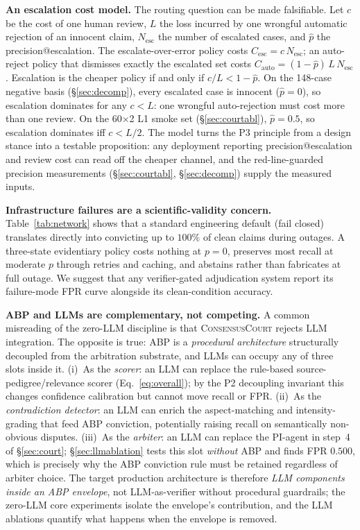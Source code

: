 \documentclass[11pt]{article}
\newcommand{\court}{\textsc{ConsensusCourt}}
\begin{document}
\textbf{An escalation cost model.} The routing question can be made
falsifiable. Let $c$ be the cost of one human review, $L$ the loss incurred
by one wrongful automatic rejection of an innocent claim,
$N_{\mathrm{esc}}$ the number of escalated cases, and $\hat p$ the
precision@escalation. The escalate-over-error policy costs
$C_{\mathrm{esc}} = c\,N_{\mathrm{esc}}$; an auto-reject policy that
dismisses exactly the escalated set costs
$C_{\mathrm{auto}} = (1-\hat p)\,L\,N_{\mathrm{esc}}$. Escalation is the
cheaper policy if and only if $c/L < 1-\hat p$. On the 148-case negative
basis (\S\ref{sec:decomp}), every escalated case is innocent
($\hat p = 0$), so escalation dominates for any $c < L$: one wrongful
auto-rejection must cost more than one review. On the 60$\times$2 L1 smoke
set (\S\ref{sec:courtabl}), $\hat p = 0.5$, so escalation dominates iff
$c < L/2$. The model turns the P3 principle from a design stance into a
testable proposition: any deployment reporting precision@escalation and
review cost can read off the cheaper channel, and the red-line-guarded
precision measurements (\S\ref{sec:courtabl}, \S\ref{sec:decomp}) supply
the measured inputs.

\textbf{Infrastructure failures are a scientific-validity concern.}
Table~\ref{tab:network} shows that a standard engineering default (fail
closed) translates directly into convicting up to $100\%$ of clean claims
during outages. A three-state evidentiary policy costs nothing at $p=0$,
preserves most recall at moderate $p$ through retries and caching, and
abstains rather than fabricates at full outage. We suggest that any
verifier-gated adjudication system report its failure-mode FPR curve
alongside its clean-condition accuracy.

\textbf{ABP and LLMs are complementary, not competing.} A common
misreading of the zero-LLM discipline is that \court{} rejects LLM
integration. The opposite is true: ABP is a \emph{procedural architecture}
structurally decoupled from the arbitration substrate, and LLMs can occupy
any of three slots inside it. (i)~As the \emph{scorer}: an LLM can replace
the rule-based source-pedigree/relevance scorer (Eq.~\ref{eq:overall}); by
the P2 decoupling invariant this changes confidence calibration but cannot
move recall or FPR. (ii)~As the \emph{contradiction detector}: an LLM can
enrich the aspect-matching and intensity-grading that feed ABP conviction,
potentially raising recall on semantically non-obvious disputes. (iii)~As
the \emph{arbiter}: an LLM can replace the PI-agent in step~4 of
\S\ref{sec:court}; \S\ref{sec:llmablation} tests this slot \emph{without}
ABP and finds FPR $0.500$, which is precisely why the ABP conviction rule
must be retained regardless of arbiter choice. The target production
architecture is therefore \emph{LLM components inside an ABP envelope},
not LLM-as-verifier without procedural guardrails; the zero-LLM core
experiments isolate the envelope's contribution, and the LLM ablations
quantify what happens when the envelope is removed.
\end{document}
